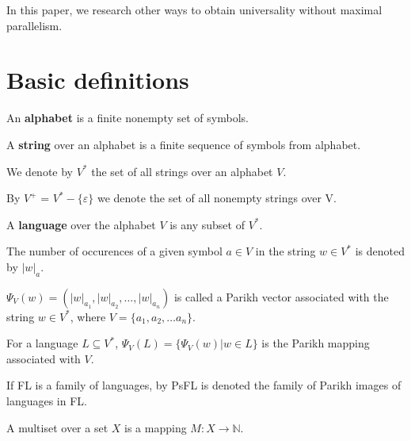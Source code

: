\documentclass[a4paper,10pt]{article}
\def\eps{\varepsilon}
\begin{document}
In this paper, we research other ways to obtain universality without maximal parallelism.

\section{Basic definitions}
\begin{definicia}
  An {\bf alphabet} is a finite nonempty set of symbols.
\end{definicia}

\begin{definicia}
  A {\bf string} over an alphabet is a finite sequence of symbols from alphabet.
\end{definicia}

\begin{definicia}
  We denote by $V^*$ the set of all strings over an alphabet $V$.
\end{definicia}

\begin{definicia}
  By $V^+$ = $V^* - \{\eps\}$ we denote the set of all nonempty strings over V.
\end{definicia}

\begin{definicia}
  A {\bf language} over the alphabet $V$ is any subset of $V^*$.
\end{definicia}

\begin{definicia}
  The number of occurences of a given symbol $a\in V$ in the string $w\in V^*$ is denoted by $|w|_a$.
\end{definicia}

\begin{definicia}
  $\Psi_V(w)=(|w|_{a_1},|w|_{a_2},\dots,|w|_{a_n})$ is called a Parikh vector associated with the string $w\in V^*$, where $V=\{a_1,a_2,\dots a_n\}$.
\end{definicia}

\begin{definicia}
  For a language $L\subseteq V^*$, $\Psi_V(L)=\{\Psi_V(w)|w\in L\}$ is the Parikh mapping associated with $V$.
\end{definicia}

\begin{definicia}
  If FL is a family of languages, by PsFL is denoted the family of Parikh images of languages in FL.
\end{definicia}

\begin{definicia}
  A multiset over a set $X$ is a mapping $M: X\rightarrow \mathbb N$.
\end{definicia}
\end{document}

